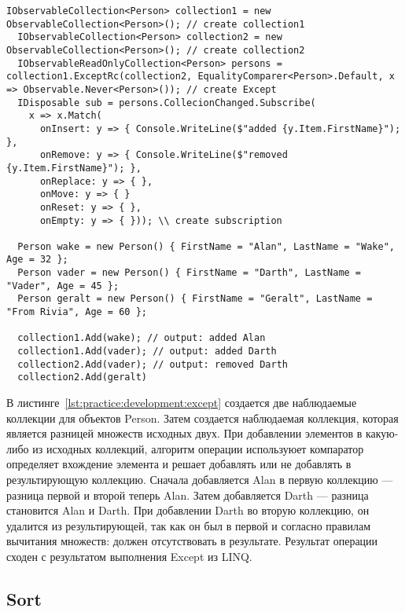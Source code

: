 \begin{lstlisting}[style=csharpinlinestyle, caption={Пример использования Except}, label=lst:practice:development:except]
  IObservableCollection<Person> collection1 = new ObservableCollection<Person>(); // create collection1
  IObservableCollection<Person> collection2 = new ObservableCollection<Person>(); // create collection2
  IObservableReadOnlyCollection<Person> persons = collection1.ExceptRc(collection2, EqualityComparer<Person>.Default, x => Observable.Never<Person>()); // create Except
  IDisposable sub = persons.CollecionChanged.Subscribe(
    x => x.Match(
      onInsert: y => { Console.WriteLine($"added {y.Item.FirstName}"); },
      onRemove: y => { Console.WriteLine($"removed {y.Item.FirstName}"); },
      onReplace: y => { },
      onMove: y => { }
      onReset: y => { },
      onEmpty: y => { })); \\ create subscription

  Person wake = new Person() { FirstName = "Alan", LastName = "Wake", Age = 32 };
  Person vader = new Person() { FirstName = "Darth", LastName = "Vader", Age = 45 };
  Person geralt = new Person() { FirstName = "Geralt", LastName = "From Rivia", Age = 60 };

  collection1.Add(wake); // output: added Alan
  collection1.Add(vader); // output: added Darth
  collection2.Add(vader); // output: removed Darth
  collection2.Add(geralt)
\end{lstlisting}

В листинге~\ref{lst:practice:development:except} создается две наблюдаемые коллекции для объектов Person. Затем создается наблюдаемая коллекция, которая является разницей множеств исходных двух.
При добавлении элементов в какую-либо из исходных коллекций, алгоритм операции используюет компаратор определяет вхождение элемента и решает добавлять или не добавлять в результирующую коллекцию.
Сначала добавляется Alan в первую коллекцию --- разница первой и второй теперь Alan. Затем добавляется Darth --- разница становится Alan и Darth.
При добавлении Darth во вторую коллекцию, он удалится из результирующей, так как он был в первой и согласно правилам вычитания множеств: должен отсутствовать в результате.
Результат операции сходен с результатом выполнения Except из LINQ.

\subsection{Sort}
\label{sub:development:sort}

